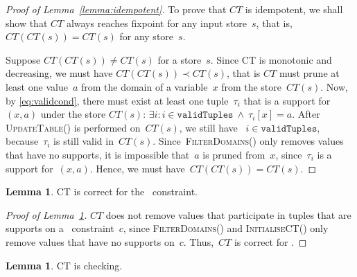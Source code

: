 \documentclass[a4paper,11pt]{article}
\theoremstyle{definition}
\newtheorem{lemma}[theorem]{Lemma}
\newcommand{\Table}{\Constraint{Table}}
\newcommand{\Lemmaref}[1]{Lemma~\ref{#1}}
\newcommand{\Eqref}[1]{\eqref{#1}}
\newcommand{\CurrTable}{\texttt{validTuples}}
\def\UpdateTable{\textsc{Update\-Table}}
\def\FilterDomains{\textsc{Filter\-Domains}}
\def\InitialiseCT{\textsc{Initialise\-CT}}
\numberwithin{equation}{section}
\begin{document}
\begin{proof}[Proof of \Lemmaref{lemma:idempotent}]
  To prove that $CT$ is idempotent, we shall show that $CT$ always reaches
  fixpoint for any input store~$s$, that is, $CT(CT(s)) = CT(s)$ for any
  store~$s$.

  Suppose $CT(CT(s)) \neq CT(s)$ for a store~$s$.
  Since CT is monotonic
  and decreasing, we must have $CT(CT(s)) \prec CT(s)$, that is $CT$
  must prune at least one value~$a$ from the domain of a variable~$x$
  from the store~$CT(s)$.
  Now, by \Eqref{eq:validcond}, there must exist at least one
  tuple~$\tau_i$
  that is a support for~$(x,a)$ under the store $CT(s)$:
  $\exists i: i \in \CurrTable \ \land \ \tau_i[x] = a$.
  After \UpdateTable() is performed on~$CT(s)$, we still have
  ~$i \in \CurrTable$, because~$\tau_i$ is still valid in~$CT(s)$.
  Since~\FilterDomains() only removes values that have no supports,
  it is impossible that~$a$ is pruned from~$x$, since~$\tau_i$ is a
  support for~$(x,a)$. Hence, we must have~$CT(CT(s)) = CT(s)$.
\end{proof}


\begin{lemma}\label{lemma:correct}
  CT is correct for the \Table~constraint.
\end{lemma}

\begin{proof}[Proof of \Lemmaref{lemma:correct}]
  $CT$ does not remove values that participate in tuples that are supports
  on a \Table~constraint~$c$,
  since \FilterDomains() and \InitialiseCT() only remove values that
  have no supports on~$c$. Thus,~$CT$ is correct for \Table.
\end{proof}

\begin{lemma}\label{lemma:checking}
  CT is checking.
\end{lemma}
\end{document}
